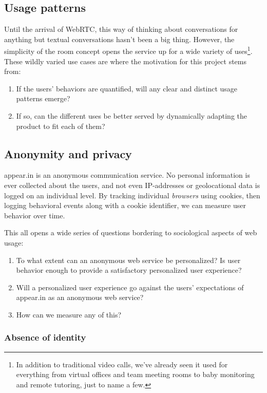 \subsection{Usage patterns}

Until the arrival of WebRTC, this way of thinking about conversations for anything but textual conversations hasn't been a big thing. However, the simplicity of the room concept opens the service up for a wide variety of uses\footnote{In addition to traditional video calls, we've already seen it used for everything from virtual offices and team meeting rooms to baby monitoring and remote tutoring, just to name a few.}. These wildly varied use cases are where the motivation for this project stems from:

\begin{enumerate}
  \item If the users' behaviors are quantified, will any clear and distinct usage patterns emerge?
  \item If so, can the different uses be better served by dynamically adapting the product to fit each of them?
\end{enumerate}

\subsection{Anonymity and privacy}

appear.in is an anonymous communication service. No personal information is ever collected about the users, and not even IP-addresses or geolocational data is logged on an individual level. By tracking individual \emph{browsers} using cookies, then logging behavioral events along with a cookie identifier, we can measure user behavior over time.

This all opens a wide series of questions bordering to sociological aspects of web usage:

\begin{enumerate}
  \item
    To what extent can an anonymous web service be personalized?
    Is user behavior enough to provide a satisfactory personalized user experience?
  \item
    Will a personalized user experience go against the users' expectations of appear.in as an anonymous web service?
  \item
    How can we measure any of this?
\end{enumerate}

\subsubsection{Absence of identity} %

